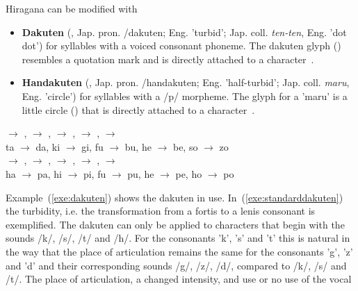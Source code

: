 Hiragana can be modified with
\begin{itemize}

  \item \textbf{Dakuten} (, Jap. pron. /dakuten;
        Eng. 'turbid'; Jap. coll. \emph{ten-ten}, Eng. 'dot dot') for 
        syllables with a voiced consonant phoneme. The dakuten glyph ()  
        resembles a quotation mark and is directly attached to a 
        character~.

  \item \textbf{Handakuten} (,
        Jap. pron. /handakuten; 
        Eng. 'half-turbid'; Jap. coll. \emph{maru}, Eng. 'circle') for syllables 
        with a /p/ morpheme. The glyph for a 'maru' is a little circle ()
        that is directly attached to a character~.

\end{itemize}
\begin{exe}
\ex \label{exe:dakuten}
\begin{xlist}
\ex \label{exe:standarddakuten}
\gll {} $\rightarrow$ ,  $\rightarrow$ ,  $\rightarrow$ ,  $\rightarrow$ ,  $\rightarrow$  \\
ta $\rightarrow$ da, ki $\rightarrow$ gi, fu $\rightarrow$ bu, he $\rightarrow$ be, so $\rightarrow$ zo \\

\ex \label{exe:handakuten}
\gll {} $\rightarrow$ ,  $\rightarrow$ ,  $\rightarrow$ ,  $\rightarrow$ ,  $\rightarrow$  \\
ha $\rightarrow$ pa, hi $\rightarrow$ pi, fu $\rightarrow$ pu, he $\rightarrow$ pe, ho $\rightarrow$ po \\
\end{xlist}
\end{exe}
Example~(\ref{exe:dakuten}) shows the dakuten in use. 
In~(\ref{exe:standarddakuten}) the turbidity, i.e. the transformation from a 
fortis to a lenis consonant is exemplified. 
The dakuten can only be applied to characters that begin with the sounds 
/k/, /s/, /t/ and /h/. For the consonants 'k', 's' and 't' this is natural in the
way that the place of articulation remains the same for the consonants 'g', 'z' 
and 'd' and their corresponding sounds /g/, /z/, /d/, 
compared to /k/, /s/ and /t/.
The place of articulation, a changed intensity, and use or no use of the vocal 
